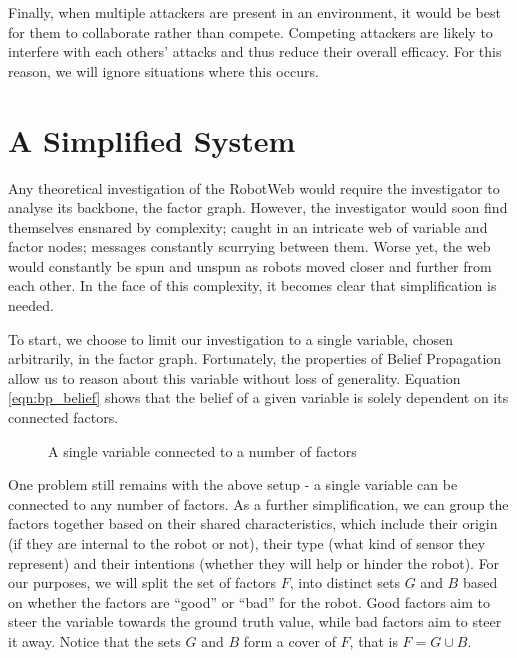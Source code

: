 Finally, when multiple attackers are present in an environment, it would be best for them to collaborate rather than compete. Competing attackers are likely to interfere with each others' attacks and thus reduce their overall efficacy. For this reason, we will ignore situations where this occurs.


\section{A Simplified System} \label{section:attack-analysis}
Any theoretical investigation of the RobotWeb would require the investigator to analyse its backbone, the factor graph. However, the investigator would soon find themselves ensnared by complexity; caught in an intricate web of variable and factor nodes; messages constantly scurrying between them. Worse yet, the web would constantly be spun and unspun as robots moved closer and further from each other. In the face of this complexity, it becomes clear that simplification is needed.

To start, we choose to limit our investigation to a single variable, chosen arbitrarily, in the factor graph. Fortunately, the properties of Belief Propagation allow us to reason about this variable without loss of generality. Equation \ref{eqn:bp_belief} shows that the belief of a given variable is solely dependent on its connected factors. 

\begin{figure}[!h]
	\centering
	

	\caption[Single Variable in a Factor Graph]{A single variable connected to a number of factors}
\end{figure}

One problem still remains with the above setup - a single variable can be connected to any number of factors. As a further simplification, we can group the factors together based on their shared characteristics, which include their origin (if they are internal to the robot or not), their type (what kind of sensor they represent) and their intentions (whether they will help or hinder the robot). For our purposes, we will split the set of factors $F$, into distinct sets $G$ and $B$ based on whether the factors are ``good'' or ``bad'' for the robot. Good factors aim to steer the variable towards the ground truth value, while bad factors aim to steer it away. Notice that the sets $G$ and $B$ form a cover of $F$, that is $F = G \cup B$.

